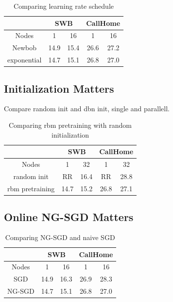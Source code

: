 \documentclass{article}
\begin{document}
\begin{table}
  \centering
  \begin{tabular}{c|c|c|c|c}
    \hline
    & \multicolumn{2}{c|}{SWB}  & \multicolumn{2}{c}{CallHome} \\
    \hline
    Nodes       &  1      & 16    &  1    & 16 \\
    \hline
    Newbob      & 14.9    & 15.4  & 26.6  & 27.2 \\
    \hline
    exponential & 14.7    & 15.1  & 26.8  & 27.0 \\
    \hline
  \end{tabular}
  \caption{Comparing learning rate schedule}
  \label{tab:init}
\end{table}

\subsection{Initialization Matters}
\label{sec:init}
Compare random init and dbn init, single and parallell.

\begin{table}
  \centering
  \begin{tabular}{c|c|c|c|c}
    \hline
    & \multicolumn{2}{c|}{SWB}  & \multicolumn{2}{c}{CallHome} \\
    \hline
    Nodes          &  1     & 32     &   1    & 32\\
    \hline
    random init     & RR    & 16.4   &  RR    & 28.8 \\
    \hline
    rbm pretraining & 14.7  & 15.2   & 26.8   & 27.1 \\
    \hline
  \end{tabular}
  \caption{Comparing rbm pretraining with random initialization}
  \label{tab:init}
\end{table}

\subsection{Online NG-SGD Matters}
\begin{table}
  \centering
  \begin{tabular}{c|c|c|c|c}
    \hline
    & \multicolumn{2}{c|}{SWB}  & \multicolumn{2}{c}{CallHome} \\
    \hline
     Nodes  &  1    & 16        &   1   &  16 \\
    \hline
    SGD     & 14.9    & 16.3    &  26.9 & 28.3 \\
    \hline
    NG-SGD  & 14.7    & 15.1    &  26.8 & 27.0  \\
    \hline
  \end{tabular}
  \caption{Comparing NG-SGD and naive SGD}
  \label{tab:ngsgd}
\end{table}
\end{document}
